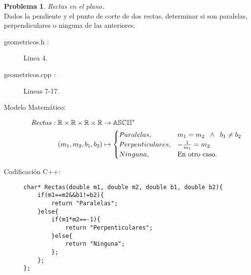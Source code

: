 \documentclass{article}
\theoremstyle{plain}
\theoremstyle{definition}
\newtheorem{problem}{Problema}
\begin{document}
\begin{problem} \emph{Rectas en el plano.}\\
\hspace*{7mm}Dados la pendiente y el punto de corte de dos rectas, determinar si son paralelas, perpendiculares o ninguna de las anteriores.
%
\begin{description}
\item[geometricos.h :] Linea 4. \item[geometricos.cpp :] Lineas 7-17.

\item[Modelo Matemático:]
%
\begin{align*}
Rectas: \mathbb{R}\times\mathbb{R}\times\mathbb{R}\times\mathbb{R} &\to \mathbb{ASCII}^{*}\\
(m_{1},m_{2},b_{1},b_{2}) &\mapsto
\begin{cases}
Paralelas, &m_{1}=m_{2} \hspace*{2mm}\wedge\hspace*{2mm}b_{1} \neq b_{2}\\
Perpenticulares, &-\frac{1}{m_{1}}=m_{2}\\
Ninguna,& \text{En otro caso.}\\
\end{cases}
\end{align*}
%
\item[Codificación \textsf{C++}:]\hfill
%
\begin{verbatim}
char* Rectas(double m1, double m2, double b1, double b2){
    if(m1==m2&&b1!=b2){
        return "Paralelas";
    }else{
        if(m1*m2==-1){
            return "Perpenticulares";
        }else{
            return "Ninguna";
        };
    };
};
\end{verbatim}
\end{description}
\end{problem}
\end{document}
